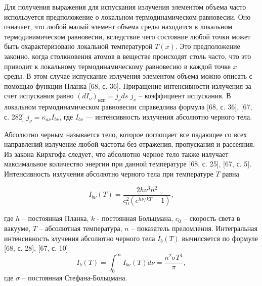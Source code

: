 Для получения выражения для испускания излучения элементом объема
часто используется предположение о локальном термодинамическом равновесии.
Оно означает, что любой малый элемент объема среды находится в
локальном термодинамическом равновесии, вследствие чего состояние любой
точки может быть охарактеризовано локальной температурой $T(x)$.
Это предположение законно, когда столкновения атомов в веществе происходят столь
часто, что это приводит к локальному термодинамическому равновесию в каждой точке $x$ среды.
В этом случае испускание излучения элементом объема
можно описать с помощью функции Планка [68, с. 36].
Приращение интенсивности излучения за счет испускания равно
$(dI_\nu)_\text{исп}  = j_\nu ds$  $j_\nu$ -- коэффициент испускания.
В локальном термодинамическом равновесии справедлива формула [68, с. 36],
[67, с. 282] $j_\nu = \kappa_{a\nu} I_{b\nu}$, где
$I_{b\nu}$ — интенсивность излучения абсолютно черного тела.


Абсолютно черным называется тело, которое поглощает все падающее
со всех направлений излучение любой частоты без отражения, пропускания и
рассеяния. Из закона Кирхгофа следует, что абсолютно черное тело также излучает
максимальное количество энергии при данной температуре [68, с. 25], [67, с. 5].
Интенсивность излучения абсолютно черного тела при температуре $T$ равна

\[
    I_{b\nu}(T) = \frac{2h\nu^3n^2}{c^2_0(e^{h\nu/kT} - 1)},
\]

где $h$ -- постоянная Планка, $k$ - постоянная Больцмана, $c_0$ -- скорость света в вакууме,
$T$ -- абсолютная температура, $n$ -- показатель преломления.
Интегральная интенсивность злучения абсолютно черного тела $I_b(T)$ вычилсяется по формуле [68, с. 28], [67, с. 10]
\[
    I_b(T) = \int^{\infty}_0 I_{b\nu}(T) d\nu = \frac{n^2 \sigma T^4}{\pi},
\]
где $\sigma$ -- постоянная Стефана-Больцмана.


